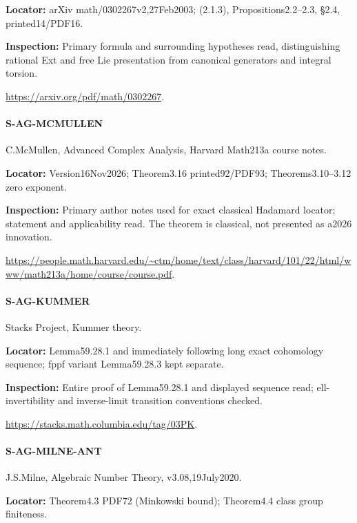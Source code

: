 \documentclass[11pt,a4paper]{article}
\begin{document}
\textbf{Locator:} arXiv math/\allowbreak{}0302267v2,27Feb2003; (2.\allowbreak{}1.\allowbreak{}3), Propositions2.\allowbreak{}2–\allowbreak{}2.\allowbreak{}3, §2.\allowbreak{}4, printed14/\allowbreak{}PDF16.

\textbf{Inspection:} Primary formula and surrounding hypotheses read, distinguishing rational Ext and free Lie presentation from canonical generators and integral torsion.\allowbreak{}

\url{https://arxiv.org/pdf/math/0302267}.

\paragraph{S-AG-MCMULLEN} C.\allowbreak{}McMullen, Advanced Complex Analysis, Harvard Math213a course notes.

\textbf{Locator:} Version16Nov2026; Theorem3.\allowbreak{}16 printed92/\allowbreak{}PDF93; Theorems3.\allowbreak{}10–\allowbreak{}3.\allowbreak{}12 zero exponent.

\textbf{Inspection:} Primary author notes used for exact classical Hadamard locator; statement and applicability read.\allowbreak{} The theorem is classical, not presented as a2026 innovation.\allowbreak{}

\url{https://people.math.harvard.edu/~ctm/home/text/class/harvard/101/22/html/www/math213a/home/course/course.pdf}.

\paragraph{S-AG-KUMMER} Stacks Project, Kummer theory.

\textbf{Locator:} Lemma59.\allowbreak{}28.\allowbreak{}1 and immediately following long exact cohomology sequence; fppf variant Lemma59.\allowbreak{}28.\allowbreak{}3 kept separate.

\textbf{Inspection:} Entire proof of Lemma59.\allowbreak{}28.\allowbreak{}1 and displayed sequence read; ell-invertibility and inverse-limit transition conventions checked.\allowbreak{}

\url{https://stacks.math.columbia.edu/tag/03PK}.

\paragraph{S-AG-MILNE-ANT} J.\allowbreak{}S.\allowbreak{}Milne, Algebraic Number Theory, v3.\allowbreak{}08,19July2020.

\textbf{Locator:} Theorem4.\allowbreak{}3 PDF72 (Minkowski bound); Theorem4.\allowbreak{}4 class group finiteness.
\end{document}
